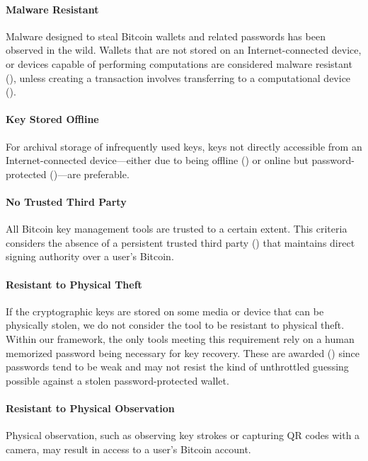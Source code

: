 \paragraph{Malware Resistant}
\label{Malware Resistant}
Malware designed to steal Bitcoin wallets and related passwords has been observed in the wild. Wallets that are not stored on an Internet-connected device, or devices capable of performing computations are considered malware resistant (\full), unless creating a transaction involves transferring to a computational device (\prt). 

\paragraph{Key Stored Offline}
\label{Key Kept Offline}
For archival storage of infrequently used keys, keys not directly accessible from an Internet-connected device---either due to being offline (\full) or online but password-protected (\prt)---are preferable. 

\paragraph{No Trusted Third Party}
\label{No Trusted Third Party}
All Bitcoin key management tools are trusted to a certain extent. 
This criteria considers the absence of a persistent trusted third party (\full) that maintains direct signing authority over a user's Bitcoin. 

\paragraph{Resistant to Physical Theft}
\label{Resistant to Physical Theft}
If the cryptographic keys are stored on some media or device that can be physically stolen, we do not consider the tool to be resistant to physical theft. Within our framework, the only tools meeting this requirement rely on a human memorized password being necessary for key recovery. These are awarded (\prt) since passwords tend to be weak and may not resist the kind of unthrottled guessing possible against a stolen password-protected wallet. 

\paragraph{Resistant to Physical Observation}
\label{Resistant to Physical Observation}
Physical observation, such as observing key strokes or capturing QR codes with a camera, may result in access to a user's Bitcoin account. 

